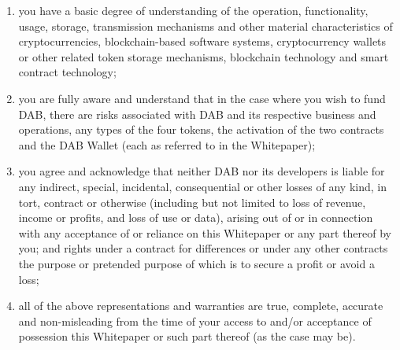 \documentclass[review]{elsarticle}
\begin{document}
\begin{enumerate}
   \item you have a basic degree of understanding of the operation, functionality, usage, storage, transmission mechanisms and other material characteristics of cryptocurrencies, blockchain-based software systems, cryptocurrency wallets or other related token storage mechanisms, blockchain technology and smart contract technology;
   \item you are fully aware and understand that in the case where you wish to fund DAB, there are risks associated with DAB and its respective business and operations, any types of the four tokens, the activation of the two contracts and the DAB Wallet (each as referred to in the Whitepaper);
   \item you agree and acknowledge that neither DAB nor its developers is liable for any indirect, special, incidental, consequential or other losses of any kind, in tort, contract or otherwise (including but not limited to loss of revenue, income or profits, and loss of use or data), arising out of or in connection with any acceptance of or reliance on this Whitepaper or any part thereof by you; and rights under a contract for differences or under any other contracts the purpose or pretended purpose of which is to secure a profit or avoid a loss;
   \item all of the above representations and warranties are true, complete, accurate and non-misleading from the time of your access to and/or acceptance of possession this Whitepaper or such part thereof (as the case may be).
\end{enumerate}
\end{document}
